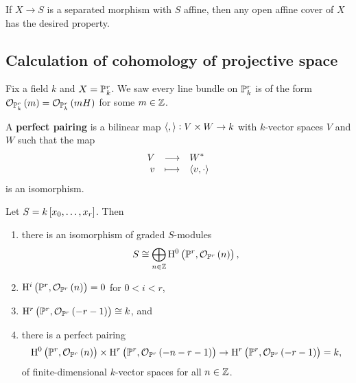 \begin{remark*}
If $ X \to S $ is a separated morphism with $ S $ affine, then any open affine cover of $ X $ has the desired property.
\end{remark*}

\pagebreak

\subsection{Calculation of cohomology of projective space}

Fix a field $ k $ and $ X = \mathbb{P}_k^r $. We saw every line bundle on $ \mathbb{P}_k^r $ is of the form $ \OOO_{\PP_k^r}\br{m} = \OOO_{\PP_k^r}\br{mH} $ for some $ m \in \mathbb{Z} $.

\begin{definition*}
A \textbf{perfect pairing} is a bilinear map $ \left\langle , \right\rangle : V \times W \to k $ with $ k $-vector spaces $ V $ and $ W $ such that the map
$$ \function{V}{W^*}{v}{\abr{v, \cdot}} $$
is an isomorphism.
\end{definition*}

\begin{theorem}
Let $ S = k\sbr{x_0, \dots, x_r} $. Then
\begin{enumerate}
\item there is an isomorphism of graded $ S $-modules
$$ S \cong \bigoplus_{n \in \ZZ} \H^0\br{\PP^r, \OOO_{\PP^r}\br{n}}, $$
\item $ \H^i\br{\PP^r, \OOO_{\PP^r}\br{n}} = 0 $ for $ 0 < i < r $,
\item $ \H^r\br{\PP^r, \OOO_{\PP^r}\br{-r - 1}} \cong k $, and
\item there is a perfect pairing
$$ \H^0\br{\PP^r, \OOO_{\PP^r}\br{n}} \times \H^r\br{\PP^r, \OOO_{\PP^r}\br{-n - r - 1}} \to \H^r\br{\PP^r, \OOO_{\PP^r}\br{-r - 1}} = k, $$
of finite-dimensional $ k $-vector spaces for all $ n \in \mathbb{Z} $.
\end{enumerate}
\end{theorem}

